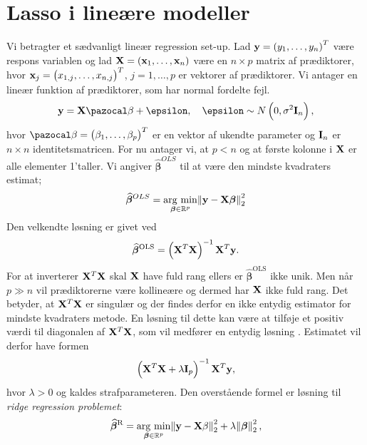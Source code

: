 \chapter{Lasso i lineære modeller}
Vi betragter et sædvanligt lineær regression set-up. Lad $\textbf{y} = \del{y_1, \dots, y_n}^T$ være respons variablen og lad $\textbf{X} = \del{\textbf{x}_1, \dots, \textbf{x}_n}$ være en $n \times p$ matrix af prædiktorer, hvor $\textbf{x}_j = \del{x_{1,j}, \dots, x_{n,j}}^T$, $j = 1, \dots, p$ er vektorer af prædiktorer. 
Vi antager en lineær funktion af prædiktorer, som har normal fordelte fejl. 
\begin{align*}
\textbf{y} = \textbf{X} \mathcal{\beta} + \epsilon, \quad \epsilon \sim N \del{0, \sigma^2 \text{\textbf{I}}_n},
\end{align*}
hvor $\mathcal{\beta} = \del{\beta_1, \dots, \beta_p}^T$ er en vektor af ukendte parameter og $\text{\textbf{I}}_n$ er $n \times n$ identitetsmatricen. 
For nu antager vi, at $p<n$ og at første kolonne i $\mathbf{X}$ er alle elementer 1'taller. 
Vi angiver $\widehat{\boldsymbol{\beta}}^{OLS}$ til at være den mindste kvadraters estimat;
\begin{align*}
\widehat{\boldsymbol{\beta}}^{OLS} = \underset{\boldsymbol\beta \in \mathbb{R}^p}{\operatorname*{\arg\,\min}} \norm{ \textbf{y} - \textbf{X}\boldsymbol\beta}^2_2
\end{align*}
Den velkendte løsning er givet ved 
\begin{align*}
\widehat{\boldsymbol\beta}^{\text{OLS}} = \del{\X^T \X}^{-1} \X^T \y.
\end{align*}
For at inverterer $\mathbf{X}^T \mathbf{X}$ skal $\mathbf{X}$ have fuld rang ellers er $\widehat{\boldsymbol\beta}^{\text{OLS}}$ ikke unik. 
Men når  \(p \gg n\) vil prædiktorerne være kollineære og dermed har \(\mathbf{X}\) ikke fuld rang.
Det betyder, at $\mathbf{X}^T \mathbf{X}$ er singulær og der findes derfor en ikke entydig estimator for mindste kvadraters metode.
En løsning til dette kan være at tilføje et positiv værdi til diagonalen af $\mathbf{X}^T \mathbf{X}$, som vil medfører en entydig løsning . 
Estimatet vil derfor have formen
\begin{align*}
 \del{\X^T \X + \lambda \text{\textbf{I}}_p}^{-1} \X^T \y,
\end{align*}
hvor $\lambda > 0$ og kaldes strafparameteren. Den overstående formel er løsning til \textit{ridge regression problemet}:
\begin{align}
 \widehat{\boldsymbol\beta}^{\text{R}} = \underset{\boldsymbol\beta \in \mathbb{R}^p}{\operatorname*{\arg\,\min}}  \norm{\mathbf{y} - \mathbf{X}\beta}^2_2 + \lambda \norm{\boldsymbol\beta}_2^2,
\end{align} \label{eq:2.8}
